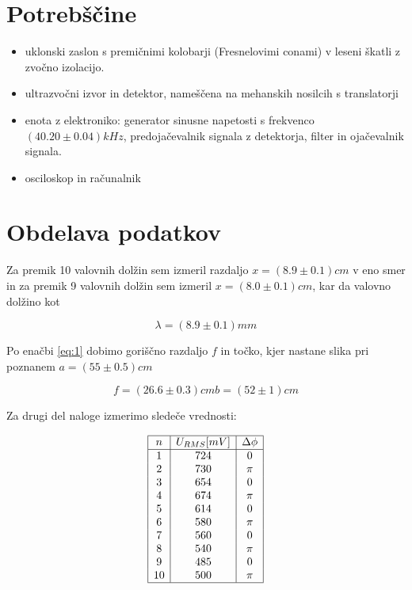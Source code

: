 \documentclass[12pt]{report}
\begin{document}
\begingroup
\let\clearpage\relax

\chapter*{Potrebščine}
\begin{itemize}
  \item uklonski zaslon s premičnimi kolobarji (Fresnelovimi conami)  v leseni škatli z zvočno izolacijo. 
  \item ultrazvočni izvor in detektor, nameščena na mehanskih nosilcih s translatorji
  \item enota z elektroniko: generator sinusne napetosti s frekvenco $(40.20 \pm 0.04) kHz$, predojačevalnik signala z detektorja, filter in ojačevalnik signala.
  \item osciloskop in računalnik 
\end{itemize}

\endgroup


\chapter*{Obdelava podatkov}

Za premik 10 valovnih dolžin sem izmeril razdaljo $x = (8.9 \pm 0.1)cm$ v eno smer in za premik 9 valovnih dolžin sem izmeril $x = (8.0 \pm 0.1)cm$, kar da valovno dolžino kot 

\[
  \lambda = (8.9 \pm 0.1)mm
\]

Po enačbi \ref{eq:1} dobimo goriščno razdaljo $f$ in točko, kjer nastane slika pri poznanem $a = (55 \pm 0.5)cm$

\[
f = (26.6  \pm 0.3)cm 
b = (52 \pm 1)cm 
\]

Za drugi del naloge izmerimo sledeče vrednosti: 

\begin{tabela}[H]
  \centering
  \[
    \begin{array}{|c|c|c|} \hline
      n & U_{RMS}[mV] & \Delta \phi \\ \hline
      1  &     724 & 0\\
      2  &     730 & \pi \\
      3  &     654 & 0\\
      4  &     674 & \pi  \\
      5  &     614 & 0\\
      6  &     580 & \pi \\
      7  &     560 & 0\\
      8  &     540 & \pi  \\
      9  &     485 & 0\\
     10  &     500 & \pi \\\hline
\end{array}
\]
\end{tabela}
\end{document}
